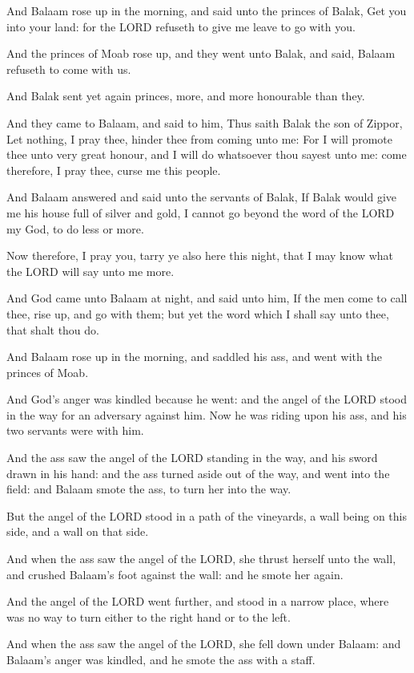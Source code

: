 \verse And Balaam rose up in the morning, and said unto the princes of
Balak, Get you into your land: for the LORD refuseth to give me leave
to go with you.

\verse And the princes of Moab rose up, and they went unto Balak, and
said, Balaam refuseth to come with us.

\verse And Balak sent yet again princes, more, and more honourable than
they.

\verse And they came to Balaam, and said to him, Thus saith Balak the
son of Zippor, Let nothing, I pray thee, hinder thee from coming unto
me: \verse For I will promote thee unto very great honour, and I will
do whatsoever thou sayest unto me: come therefore, I pray thee, curse
me this people.

\verse And Balaam answered and said unto the servants of Balak, If
Balak would give me his house full of silver and gold, I cannot go
beyond the word of the LORD my God, to do less or more.

\verse Now therefore, I pray you, tarry ye also here this night, that I
may know what the LORD will say unto me more.

\verse And God came unto Balaam at night, and said unto him, If the men
come to call thee, rise up, and go with them; but yet the word which I
shall say unto thee, that shalt thou do.

\verse And Balaam rose up in the morning, and saddled his ass, and went
with the princes of Moab.

\verse And God's anger was kindled because he went: and the angel of
the LORD stood in the way for an adversary against him. Now he was
riding upon his ass, and his two servants were with him.

\verse And the ass saw the angel of the LORD standing in the way, and
his sword drawn in his hand: and the ass turned aside out of the way,
and went into the field: and Balaam smote the ass, to turn her into
the way.

\verse But the angel of the LORD stood in a path of the vineyards, a
wall being on this side, and a wall on that side.

\verse And when the ass saw the angel of the LORD, she thrust herself
unto the wall, and crushed Balaam's foot against the wall: and he
smote her again.

\verse And the angel of the LORD went further, and stood in a narrow
place, where was no way to turn either to the right hand or to the
left.

\verse And when the ass saw the angel of the LORD, she fell down under
Balaam: and Balaam's anger was kindled, and he smote the ass with a
staff.

